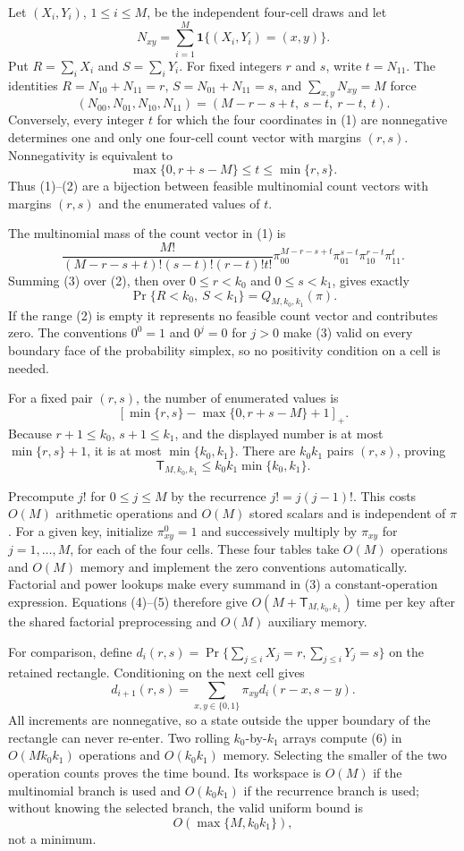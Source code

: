 Let \((X_i,Y_i)\), \(1\le i\le M\), be the independent four-cell draws and let
\[
N_{xy}=\sum_{i=1}^M\mathbf 1\{(X_i,Y_i)=(x,y)\}.
\]
Put \(R=\sum_iX_i\) and \(S=\sum_iY_i\).  For fixed integers \(r\) and \(s\), write \(t=N_{11}\).  The identities \(R=N_{10}+N_{11}=r\), \(S=N_{01}+N_{11}=s\), and \(\sum_{x,y}N_{xy}=M\) force
\[
(N_{00},N_{01},N_{10},N_{11})
=(M-r-s+t,\ s-t,\ r-t,\ t). \tag{1}
\]
Conversely, every integer \(t\) for which the four coordinates in (1) are nonnegative determines one and only one four-cell count vector with margins \((r,s)\).  Nonnegativity is equivalent to
\[
\max\{0,r+s-M\}\le t\le\min\{r,s\}. \tag{2}
\]
Thus (1)--(2) are a bijection between feasible multinomial count vectors with margins \((r,s)\) and the enumerated values of \(t\).

The multinomial mass of the count vector in (1) is
\[
\frac{M!}{(M-r-s+t)!(s-t)!(r-t)!t!}
\pi_{00}^{M-r-s+t}\pi_{01}^{s-t}\pi_{10}^{r-t}\pi_{11}^{t}. \tag{3}
\]
Summing (3) over (2), then over \(0\le r<k_0\) and \(0\le s<k_1\), gives exactly
\[
\Pr\{R<k_0,\ S<k_1\}=Q_{M,k_0,k_1}(\pi). \tag{4}
\]
If the range (2) is empty it represents no feasible count vector and contributes zero.  The conventions \(0^0=1\) and \(0^j=0\) for \(j>0\) make (3) valid on every boundary face of the probability simplex, so no positivity condition on a cell is needed.

For a fixed pair \((r,s)\), the number of enumerated values is
\[
\left[\min\{r,s\}-\max\{0,r+s-M\}+1\right]_+.
\]
Because \(r+1\le k_0\), \(s+1\le k_1\), and the displayed number is at most \(\min\{r,s\}+1\), it is at most \(\min\{k_0,k_1\}\).  There are \(k_0k_1\) pairs \((r,s)\), proving
\[
\mathsf T_{M,k_0,k_1}\le k_0k_1\min\{k_0,k_1\}. \tag{5}
\]

Precompute \(j!\) for \(0\le j\le M\) by the recurrence \(j!=j(j-1)!\).  This costs \(O(M)\) arithmetic operations and \(O(M)\) stored scalars and is independent of \(\pi\).  For a given key, initialize \(\pi_{xy}^0=1\) and successively multiply by \(\pi_{xy}\) for \(j=1,\ldots,M\), for each of the four cells.  These four tables take \(O(M)\) operations and \(O(M)\) memory and implement the zero conventions automatically.  Factorial and power lookups make every summand in (3) a constant-operation expression.  Equations (4)--(5) therefore give \(O(M+\mathsf T_{M,k_0,k_1})\) time per key after the shared factorial preprocessing and \(O(M)\) auxiliary memory.

For comparison, define \(d_i(r,s)=\Pr\{\sum_{j\le i}X_j=r,\sum_{j\le i}Y_j=s\}\) on the retained rectangle.  Conditioning on the next cell gives
\[
d_{i+1}(r,s)=\sum_{x,y\in\{0,1\}}\pi_{xy}d_i(r-x,s-y). \tag{6}
\]
All increments are nonnegative, so a state outside the upper boundary of the rectangle can never re-enter.  Two rolling \(k_0\)-by-\(k_1\) arrays compute (6) in \(O(Mk_0k_1)\) operations and \(O(k_0k_1)\) memory.  Selecting the smaller of the two operation counts proves the time bound.  Its workspace is \(O(M)\) if the multinomial branch is used and \(O(k_0k_1)\) if the recurrence branch is used; without knowing the selected branch, the valid uniform bound is
\[
O(\max\{M,k_0k_1\}), \tag{7}
\]
not a minimum.

